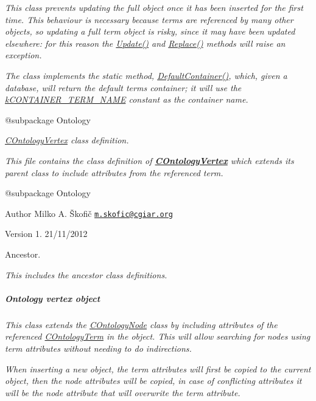 {\itshape This class prevents updating the full object once it has been inserted for the first time. This behaviour is necessary because terms are referenced by many other objects, so updating a full term object is risky, since it may have been updated elsewhere\-: for this reason the \hyperlink{}{Update()} and \hyperlink{}{Replace()} methods will raise an exception.}

{\itshape The class implements the static method, \hyperlink{}{Default\-Container()}, which, given a database, will return the default terms container; it will use the \hyperlink{}{k\-C\-O\-N\-T\-A\-I\-N\-E\-R\-\_\-\-T\-E\-R\-M\-\_\-\-N\-A\-M\-E} constant as the container name.}

{\itshape \begin{DoxyVerb} @subpackage        Ontology\end{DoxyVerb}
}

{\itshape {\itshape \hyperlink{class_c_ontology_vertex}{C\-Ontology\-Vertex}} class definition.}

{\itshape This file contains the class definition of {\bfseries \hyperlink{class_c_ontology_vertex}{C\-Ontology\-Vertex}} which extends its parent class to include attributes from the referenced term.}

{\itshape \begin{DoxyVerb} @subpackage        Ontology
\end{DoxyVerb}
}

{\itshape \begin{DoxyAuthor}{Author}
Milko A. Škofič \href{mailto:m.skofic@cgiar.org}{\tt m.\-skofic@cgiar.\-org} 
\end{DoxyAuthor}
\begin{DoxyVersion}{Version}
1. 21/11/2012
\end{DoxyVersion}
Ancestor.}

{\itshape This includes the ancestor class definitions. \subparagraph*{Ontology vertex object}}

{\itshape }

{\itshape This class extends the \hyperlink{class_c_ontology_node}{C\-Ontology\-Node} class by including attributes of the referenced \hyperlink{class_c_ontology_term}{C\-Ontology\-Term} in the object. This will allow searching for nodes using term attributes without needing to do indirections.}

{\itshape When inserting a new object, the term attributes will first be copied to the current object, then the node attributes will be copied, in case of conflicting attributes it will be the node attribute that will overwrite the term attribute.}

